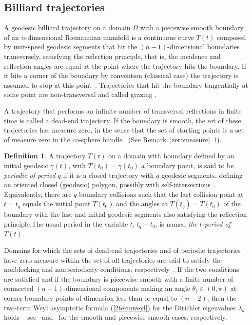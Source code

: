 \documentclass[11pt,a4paper,times]{amsart}
\theoremstyle{plain}
\theoremstyle{definition}
\newtheorem{definition}[thm]{Definition}%
\numberwithin{equation}{section}
\begin{document}
 \subsection{Billiard {trajectories}}
A geodesic billiard trajectory on a  domain $\Omega$ with a piecewise smooth boundary  of an $n$-dimensional
Riemannian manifold is a continuous curve $T(t)$ composed by unit-speed geodesic segments that hit the $(n-1)$-dimensional boundaries
transversely, satisfying the reflection principle, that is, the incidence and reflection angles are equal at the point where the
trajectory hits the boundary.
%  
If it hits a corner of the boundary by convention {(classical case)} the trajectory is assumed to stop at this point~\cite{g}.
%
Trajectories that hit the boundary  tangentially at some point are non-transversal
and called grazing  \cite[Section 1.3]{sava}.

A trajectory that performs an infinite number of transversal reflections in finite time is called a dead-end
trajectory.
% 
If the boundary is smooth, the set of these trajectories has measure zero, in the sense that the set of starting points  is
a set of measure zero in the co-sphere bundle~\cite[Lemma 1.3.11 and Appendix D]{sava} (See Remark~\ref{zeromeasure}~1).


\begin{definition}\label{periodic}
A trajectory $T(t)$ on a domain with boundary defined by an initial geodesic $\gamma(t)$, with $T(t_0)=\gamma(t_0)$ a boundary
point, is said to be {\it periodic of period  $q$} if it is a closed trajectory with $q$ geodesic segments, defining an oriented
closed {(geodesic)} polygon, possibly with self-intersections~\cite{g}. Equivalently, there are $q$ boundary collisions
such that the last collision point at $t=t_q$  equals the initial point $T(t_0)$ and the angles at $T(t_q)=T(t_0)$ of the
boundary {with the last and initial geodesic segments} also satisfying the reflection principle.The usual period in the variable
$t$, $t_q-t_0$,  is named {\it the $t$-period of $T(t)$}.
\end{definition}

Domains for which the sets of dead-end trajectories and of periodic trajectories have zero measure within the set of
all trajectories are said to satisfy the nonblocking  and nonperiodicity conditions,
respectively~\cite[Definition 1.3.22]{sava}. If the two conditions are
satisfied and if the boundary  is piecewise smooth with a finite number of connected $(n-1)$-dimensional
  components  making an angle $\theta_i\in (0, \pi)$ at corner boundary points  of dimension less than or equal to $(n-2)$,
  then the two-term Weyl asymptotic formula (\ref{2termweyl}) for the Dirichlet eigenvalues $\lambda_k$  holds
 -- see~\cite[Theorem~1.6.1 and Example~1.6.16]{sava} and~\cite{va} for the smooth and piecewise smooth cases, respectively. 
\end{document}
